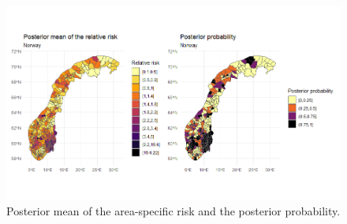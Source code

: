 \begin{figure}[H]
    \centering
    \includegraphics[width = \textwidth]{posterior_norway.png}
    \caption{Posterior mean of the area-specific risk and the posterior probability.}
    \label{posteriorNorway}
\end{figure}
%     

